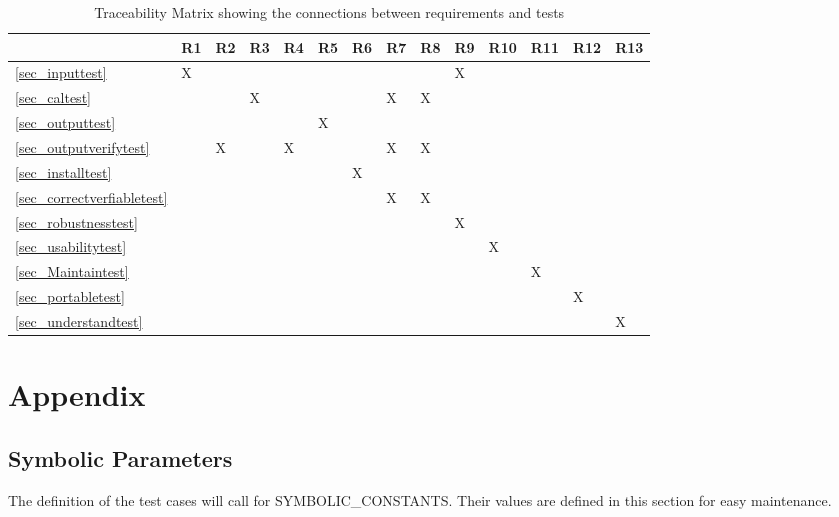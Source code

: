 \documentclass[12pt, titlepage]{article}
\begin{document}
\begin{table}[h]
\begin{tabular}{|l|l|l|l|l|l|l|l|l|l|l|l|l|l|}
\hline
 & R1 & R2 & R3 & R4 & R5 & R6 & R7 & R8 & R9 & R10 & R11 & R12 & R13 \\ \hline
\ref{sec_inputtest} & X &  &  &  &  &  &  &  & X &  &  &  &  \\ \hline
\ref{sec_caltest} &  &  & X &  &  &  & X & X &  &  &  &  &  \\ \hline
\ref{sec_outputtest} &  &  &  &  & X &  &  &  &  &  &  &  &  \\ \hline
\ref{sec_outputverifytest} &  & X &  & X &  &  & X & X &  &  &  &  &  \\ \hline
\ref{sec_installtest} &  &  &  &  &  & X &  &  &  &  &  &  &  \\ \hline
\ref{sec_correctverfiabletest} & & & & & & & X & X & & & & & \\ \hline
\ref{sec_robustnesstest} &  &  &  &  &  &  &  &  & X &  &  &  &  \\ \hline
\ref{sec_usabilitytest} &  &  &  &  &  &  &  &  &  & X &  &  &  \\ \hline
\ref{sec_Maintaintest} &  &  &  &  &  &  &  &  &  &  & X &  &  \\ \hline
\ref{sec_portabletest} &  &  &  &  &  &  &  &  &  &  &  & X &  \\ \hline
\ref{sec_understandtest} &  &  &  &  &  &  &  &  &  &  &  &  & X \\ \hline
\end{tabular}
\caption{Traceability Matrix showing the connections between requirements and
tests}
\label{Tb_trace}
\end{table}

\newpage
				




\newpage

\section{Appendix}

\subsection{Symbolic Parameters}

The definition of the test cases will call for SYMBOLIC\_CONSTANTS.
Their values are defined in this section for easy maintenance.
\end{document}
